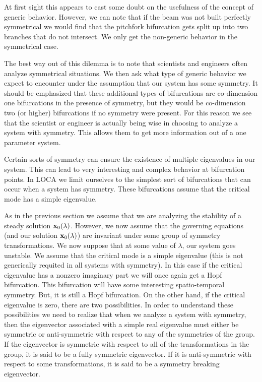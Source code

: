 At first sight this appears to cast some doubt on the usefulness of the concept of generic behavior.  However, we can note that
if the beam was not built perfectly symmetrical 
we would find that the pitchfork bifurcation gets split up 
into two branches that do not intersect.  We only get the
non-generic behavior in the symmetrical case.   

The best way out of this dilemma is to note that
scientists and engineers  often analyze symmetrical situations.
We then ask  what type of generic behavior we expect to 
encounter under the assumption that our system has some symmetry.
It should be emphasized that these additional types of 
bifurcations are co-dimension one bifurcations
 in the presence of symmetry, but they would be
 co-dimension two (or
 higher) bifurcations if no symmetry were present.  For this
reason we see that the scientist or engineer is actually 
being wise in choosing to analyze a system with symmetry.
This allows them to get more information out of a one 
parameter system.

Certain sorts of symmetry can ensure the existence of multiple
eigenvalues in our system.  This can lead to very interesting and
complex behavior at bifurcation points.  In LOCA we limit
ourselves to  the simplest sort of bifurcations that can occur
when a system has symmetry.   These bifurcations assume that
the critical mode has a simple eigenvalue.

As in the previous section we assume that we are analyzing the
stability of a steady solution ${\bf x}_0(\lambda)$.  However, we
now assume that the governing equations (and our
solution ${\bf x}_0(\lambda)$)  are invariant under
some group of symmetry transformations.  We now suppose that
at some value of $\lambda$, our system goes unstable.  
We assume that the critical mode is a simple eigenvalue (this
is not generically requited in all systems with symmetry).
In this case if the critical eigenvalue has a
 nonzero imaginary part
we will once again get a Hopf bifurcation.  This bifurcation will
have some interesting spatio-temporal symmetry.  But, it is
still a Hopf bifurcation.  On the other hand, if the critical
eigenvalue is zero, there are two possibilities.
In order to understand these possibilities we need to realize that
when we analyze a system with symmetry, then the eigenvector 
associated with a simple real  eigenvalue must either be symmetric
or anti-symmetric with respect to any of the symmetries of the
group.   If the eigenvector is symmetric
 with respect to all of the transformations in the group, it is 
said to be a fully symmetric eigenvector.  If it is anti-symmetric
with respect to some transformations, it 
is said to be a symmetry breaking eigenvector.

